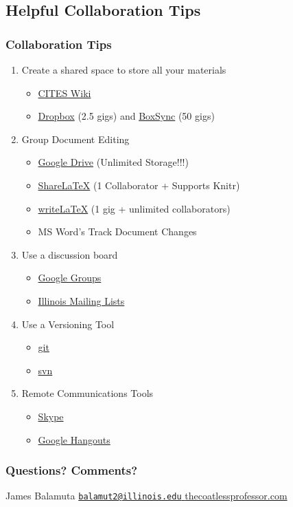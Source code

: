 \documentclass{beamer}\usepackage[]{graphicx}\usepackage[]{color}
\begin{document}
\subsection{Helpful Collaboration Tips}
\begin{frame}[fragile]
\frametitle{Collaboration Tips}
\begin{enumerate}
\item Create a shared space to store all your materials
\begin{itemize}
\item \href{https://wiki.cites.illinois.edu/wiki/}{CITES Wiki}
\item \href{www.dropbox.com}{Dropbox} (2.5 gigs) and \href{https://app.box.com/}{BoxSync} (50 gigs)
\end{itemize}
\item Group Document Editing
\begin{itemize}
\item \href{https://drive.google.com}{Google Drive} (Unlimited Storage!!!)
\item \href{www.sharelatex.com}{ShareLaTeX} (1 Collaborator + Supports Knitr)
\item \href{www.writelatex.com}{writeLaTeX} (1 gig + unlimited collaborators)
\item MS Word's Track Document Changes
\end{itemize}
\item Use a discussion board
\begin{itemize}
\item \href{https://groups.google.com/forum/#!overview}{Google Groups}
\item \href{http://www.cites.illinois.edu/maillist/}{Illinois Mailing Lists}
\end{itemize}
\item Use a Versioning Tool
\begin{itemize}
\item \href{http://git-scm.com/downloads}{git}
\item \href{https://subversion.apache.org/packages.html}{svn}
\end{itemize}
\item Remote Communications Tools
\begin{itemize}
\item \href{http://www.skype.com/en/download-skype/skype-for-computer/}{Skype}
\item \href{https://www.google.com/hangouts/}{Google Hangouts}
\end{itemize}
\end{enumerate}
\end{frame}


\begin{frame}
\frametitle{Questions? Comments?}

\centering
\Huge
James Balamuta
\href{mailto:balamut2@illinois.edu}{\nolinkurl{balamut2@illinois.edu} }
\href{http://www.thecoatlessprofessor.com}{thecoatlessprofessor.com}


\end{frame}
\end{document}
